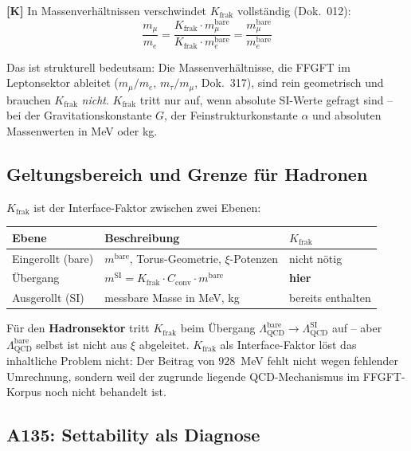 \textbf{[K]} In Massenverhältnissen verschwindet $K_{\text{frak}}$
vollständig (Dok.~012):
\begin{equation}
  \frac{m_\mu}{m_e} = \frac{K_{\text{frak}} \cdot m_\mu^{\text{bare}}}
  {K_{\text{frak}} \cdot m_e^{\text{bare}}} = \frac{m_\mu^{\text{bare}}}{m_e^{\text{bare}}}
\end{equation}

Das ist strukturell bedeutsam: Die Massenverhältnisse, die FFGFT im
Leptonsektor ableitet ($m_\mu/m_e$, $m_\tau/m_\mu$, Dok.~317), sind
rein geometrisch und brauchen $K_{\text{frak}}$ \emph{nicht}.
$K_{\text{frak}}$ tritt nur auf, wenn absolute SI-Werte gefragt sind
-- bei der Gravitationskonstante $G$, der Feinstrukturkonstante
$\alpha$ und absoluten Massenwerten in MeV oder kg.

\subsection{Geltungsbereich und Grenze für Hadronen}

$K_{\text{frak}}$ ist der Interface-Faktor zwischen zwei Ebenen:
\begin{center}
\begin{tabular}{lll}
\toprule
Ebene & Beschreibung & $K_{\text{frak}}$ \\
\midrule
Eingerollt (bare) & $m^{\text{bare}}$, Torus-Geometrie, $\xi$-Potenzen
  & nicht nötig \\
Übergang & $m^{\text{SI}} = K_{\text{frak}} \cdot C_{\text{conv}} \cdot m^{\text{bare}}$
  & \textbf{hier} \\
Ausgerollt (SI) & messbare Masse in MeV, kg & bereits enthalten \\
\bottomrule
\end{tabular}
\end{center}

Für den \textbf{Hadronsektor} tritt $K_{\text{frak}}$ beim Übergang
$\Lambda_{\text{QCD}}^{\text{bare}} \to \Lambda_{\text{QCD}}^{\text{SI}}$
auf -- aber $\Lambda_{\text{QCD}}^{\text{bare}}$ selbst ist nicht aus
$\xi$ abgeleitet. $K_{\text{frak}}$ als Interface-Faktor löst das
inhaltliche Problem nicht: Der Beitrag von $928$~MeV fehlt nicht wegen
fehlender Umrechnung, sondern weil der zugrunde liegende
QCD-Mechanismus im FFGFT-Korpus noch nicht behandelt ist.

\subsection{A135: Settability als Diagnose}

